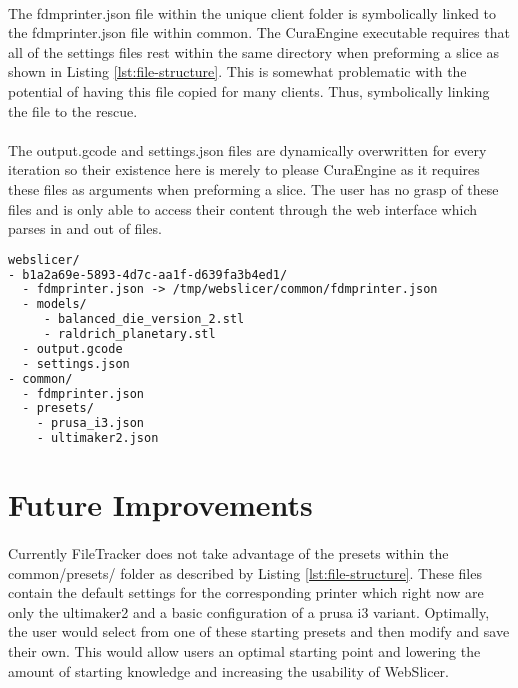 \paragraph{}
The fdmprinter.json file within the unique client folder is symbolically linked to the fdmprinter.json file within common. 
The CuraEngine executable requires that all of the settings files rest within the same directory when preforming a slice as shown in Listing \ref{lst:file-structure}.
This is somewhat problematic with the potential of having this file copied for many clients. 
Thus, symbolically linking the file to the rescue.

\paragraph{}
The output.gcode and settings.json files are dynamically overwritten for every iteration so their existence here is merely to please CuraEngine as it requires these files as arguments when preforming a slice. 
The user has no grasp of these files and is only able to access their content through the web interface which parses in and out of files.

\begin{lstlisting}[language=html, style=thesiscode, label={lst:file-structure}, caption=WebSlicer's underlying file structure supported by FileTracker.]
webslicer/
- b1a2a69e-5893-4d7c-aa1f-d639fa3b4ed1/
  - fdmprinter.json -> /tmp/webslicer/common/fdmprinter.json
  - models/
     - balanced_die_version_2.stl
     - raldrich_planetary.stl
  - output.gcode
  - settings.json
- common/
  - fdmprinter.json
  - presets/
    - prusa_i3.json
    - ultimaker2.json
\end{lstlisting}

\section{Future Improvements}
\paragraph{}
Currently FileTracker does not take advantage of the presets within the common/presets/ folder as described by Listing \ref{lst:file-structure}. 
These files contain the default settings for the corresponding printer which right now are only the ultimaker2 and a basic configuration of a prusa i3 variant. 
Optimally, the user would select from one of these starting presets and then modify and save their own.
This would allow users an optimal starting point and lowering the amount of starting knowledge and increasing the usability of WebSlicer.

